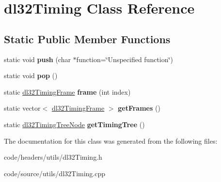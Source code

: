 \hypertarget{classdl32_timing}{\section{dl32\-Timing Class Reference}
\label{classdl32_timing}
}
\subsection*{Static Public Member Functions}
\begin{DoxyCompactItemize}
\item 
\hypertarget{classdl32_timing_a22eb96cb80187bf1f5535594edd5c737}{static void {\bfseries push} (char $\ast$function=\char`\"{}Unspecified function\char`\"{})}\label{classdl32_timing_a22eb96cb80187bf1f5535594edd5c737}

\item 
\hypertarget{classdl32_timing_adec92ef42d9fc5beb1a60b7f5167ea17}{static void {\bfseries pop} ()}\label{classdl32_timing_adec92ef42d9fc5beb1a60b7f5167ea17}

\item 
\hypertarget{classdl32_timing_a6e1d86888e166fa995932e4a36dc7896}{static \hyperlink{structdl32_timing_frame}{dl32\-Timing\-Frame} {\bfseries frame} (int index)}\label{classdl32_timing_a6e1d86888e166fa995932e4a36dc7896}

\item 
\hypertarget{classdl32_timing_ae5adf7de7e7e7de927a120ca71d18b2d}{static vector$<$ \hyperlink{structdl32_timing_frame}{dl32\-Timing\-Frame} $>$ {\bfseries get\-Frames} ()}\label{classdl32_timing_ae5adf7de7e7e7de927a120ca71d18b2d}

\item 
\hypertarget{classdl32_timing_af321f053c01b6c909ace7a0ad4c86ecc}{static \hyperlink{classdl32_timing_tree_node}{dl32\-Timing\-Tree\-Node} {\bfseries get\-Timing\-Tree} ()}\label{classdl32_timing_af321f053c01b6c909ace7a0ad4c86ecc}

\end{DoxyCompactItemize}


The documentation for this class was generated from the following files\-:\begin{DoxyCompactItemize}
\item 
code/headers/utils/dl32\-Timing.\-h\item 
code/source/utils/dl32\-Timing.\-cpp\end{DoxyCompactItemize}
